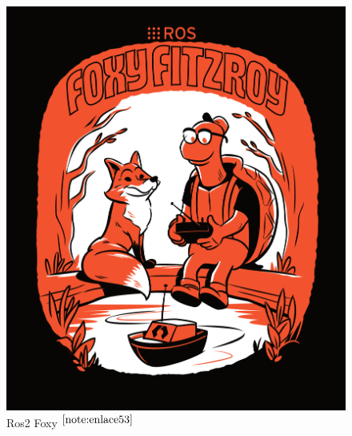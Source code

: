 \begin{figure}[ht!]
	\centering
	\begin{minipage}{0.35\linewidth}
		\centering
		\includegraphics[width=\linewidth]{figs/foxy.png}
		\caption*{\centering Ros2 Foxy $^{\ref{note:enlace53}}$} %
	\end{minipage}
	\hspace{2cm}
	\begin{minipage}{0.35\linewidth}
		\centering

\end{minipage}
\end{figure}
